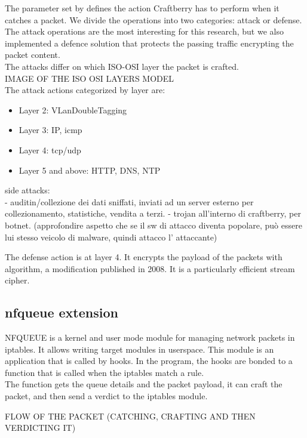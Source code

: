 \documentclass[12pt]{article}
\begin{document}
	The parameter set by  defines the action Craftberry has to perform when it catches a packet. We divide the operations into two categories: attack or defense. The attack operations are the most interesting for this research, but we also implemented a defence solution that protects the passing traffic encrypting the packet content.\\
	The attacks differ on which ISO-OSI layer the packet is crafted.\\

	IMAGE OF THE ISO OSI LAYERS MODEL\\
	
	The attack actions categorized by layer are:
	\begin{itemize}
		\item Layer 2: VLanDoubleTagging
		\item Layer 3: IP, icmp
		\item Layer 4: tcp/udp
		\item Layer 5 and above: HTTP, DNS, NTP
	\end{itemize}
	
	side attacks:\\
	- auditin/collezione dei dati sniffati, inviati ad un server esterno per collezionamento, statistiche, vendita a terzi.
	- trojan all'interno di craftberry, per botnet. (approfondire aspetto che se il sw di attacco diventa popolare, può essere lui stesso veicolo di malware, quindi attacco l' attaccante)

	The defense action is at layer 4. It encrypts the payload of the packets with  algorithm, a  modification published in 2008. It is a particularly efficient stream cipher.\\

	\subsection{nfqueue extension}
	NFQUEUE is a kernel and user mode module for managing network packets in iptables. It allows writing  target modules in userspace. This module is an application that is called by  hooks. In the program, the hooks are bonded to a function that is called when the iptables match a rule.\\
	The function gets the queue details and the packet payload, it can craft the packet, and then send a verdict to the iptables module. 

	FLOW OF THE PACKET (CATCHING, CRAFTING AND THEN VERDICTING IT)
\end{document}
